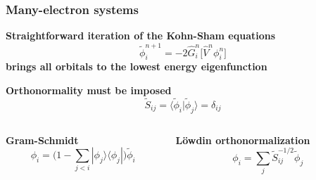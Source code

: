 \begin{frame}
    \frametitle{Many-electron systems}
    \centering
    \textbf{Straightforward iteration of the Kohn-Sham equations}
    \begin{equation}
        \nonumber
        \tilde{\phi}_i^{n+1} = -2\hat{G}_i^n \bigg[\hat{V}^n\phi_i^n\bigg]
    \end{equation}
    \textbf{brings all orbitals to the lowest energy eigenfunction}
    
    \vspace{15mm}

    \textbf{Orthonormality must be imposed}
    \begin{equation}
        \nonumber
        \tilde{S}_{ij} = \langle\tilde{\phi}_i|\tilde{\phi}_j\rangle = \delta_{ij}
    \end{equation}

    \vspace{5mm}

    \begin{columns}
    \begin{column}[b]{0.5\linewidth}
    \centering
    \textbf{Gram-Schmidt}
    \begin{equation}
	\nonumber
	\phi_i = \Big(1 - \sum_{j<i}|\phi_j\rangle\langle\phi_j|\Big)\tilde{\phi}_i
    \end{equation}
    \end{column}

    \begin{column}[b]{0.5\linewidth}
    \centering
    \textbf{L\"{o}wdin orthonormalization}
    \begin{equation}
	\nonumber
	\phi_i = \sum_j \tilde{S}_{ij}^{-1/2}\tilde{\phi}_j
    \end{equation}
    \end{column}
    \end{columns}
\end{frame}


